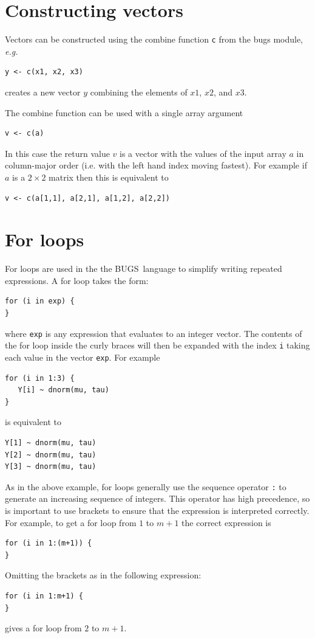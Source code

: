 \documentclass[11pt, a4paper, titlepage]{report}
\newcommand{\BUGS}{\textsf{BUGS}}
\begin{document}
\section{Constructing vectors}

Vectors can be constructed using the combine function \texttt{c} from
the \textsf{bugs} module, {\em  e.g.}
\begin{verbatim}
y <- c(x1, x2, x3)
\end{verbatim}
creates a new vector $y$ combining the elements of $x1$, $x2$, and $x3$.    

The combine function can be used with a single array argument
\begin{verbatim}
v <- c(a)
\end{verbatim}
In this case the return value $v$ is a vector with the values of the
input array $a$ in column-major order (i.e. with the left hand index
moving fastest). For example if $a$ is a $2 \times 2$ matrix then
this is equivalent to
\begin{verbatim}
v <- c(a[1,1], a[2,1], a[1,2], a[2,2])
\end{verbatim}

\section{For loops}
\label{section:forloops}

For loops are used in the the \BUGS\ language to simplify writing
repeated expressions. A for loop takes the form:
\begin{verbatim}
for (i in exp) {
}
\end{verbatim}
where \texttt{exp} is any expression that evaluates to an integer
vector. The contents of the for loop inside the curly braces will then
be expanded with the index \texttt{i} taking each value in the vector
\texttt{exp}. For example
\begin{verbatim}
for (i in 1:3) {
   Y[i] ~ dnorm(mu, tau)
}
\end{verbatim}
is equivalent to
\begin{verbatim}
Y[1] ~ dnorm(mu, tau)
Y[2] ~ dnorm(mu, tau)
Y[3] ~ dnorm(mu, tau)
\end{verbatim}
As in the above example, for loops generally use the sequence operator
\verb+:+ to generate an increasing sequence of integers. This operator
has high precedence, so is important to use brackets to ensure that
the expression is interpreted correctly. For example, to get a for
loop from $1$ to $m+1$ the correct expression is
\begin{verbatim}
for (i in 1:(m+1)) {
}
\end{verbatim}
Omitting the brackets as in the following expression:
\begin{verbatim}
for (i in 1:m+1) {
}
\end{verbatim}
gives a for loop from $2$ to $m+1$.
\end{document}
